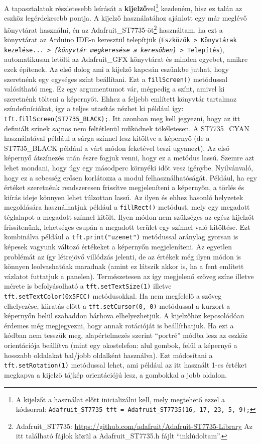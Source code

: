 \documentclass[12pt,a4paper]{article}
\begin{document}
      A tapasztalatok részletesebb leírását a \textbf{kijelző}vel\footnote{A kijelzőt a használat előtt inicializálni kell, mely megtehető ezzel a kódsorral: \texttt{Adafruit\_ST7735 tft = Adafruit\_ST7735(16, 17, 23, 5, 9);}} kezdeném, hisz ez talán az eszköz legérdekesebb pontja.
      A kijelző használatához ajánlott egy már meglévő könyvtárat használni, én az Adafruit\_ST7735-öt\footnote{Adafruit\_ST7735: \url{https://github.com/adafruit/Adafruit-ST7735-Library} Az itt található fájlok közül a Adafruit\_ST7735.h fájlt ``inklúdoltam''.} használtam, ha ezt a könyvtárat az Arduino IDE-n keresztül telepítjük (\texttt{Eszközök > Könyvtárak kezelése... > \textit{\{könyvtár megkeresése a keresőben\}} > Telepítés}), automatikusan letölti az Adafruit\_GFX könyvtárat és minden egyebet, amikre ezek építenek.
      Az első dolog ami a kijelző kapcsán eszünkbe juthat, hogy szeretnénk egy egységes színt beállítani. Ezt a \texttt{fillScreen()} metódussal valósítható meg. Ez egy argumentumot vár, mégpedig a színt, amivel ki szeretnénk tölteni a képernyőt. Ehhez a feljebb említett könyvtár tartalmaz színdefiníciókat, így a teljes utasítás nézhet ki például így: \texttt{tft.fillScreen(ST7735\_BLACK);}. Itt azonban meg kell jegyezni, hogy az itt definiált színek sajnos nem feltétlenül működnek tökéletesen. A ST7735\_CYAN használatával például a sárga színnel lesz kitöltve a képernyő (de a ST7735\_BLACK például a várt módon feketével teszi ugyanezt).
      Az első képernyő átszínezés után észre fogjuk venni, hogy ez a metódus lassú. Szemre azt lehet mondani, hogy úgy egy másodperc környéki időt vesz igénybe. Nyilvánvaló, hogy ez a sebesség erősen korlátozza a modul felhasználhatóságát. Például, ha egy értéket szeretnénk rendszeresen frissítve megjeleníteni a képernyőn, a törlés és kiírás ideje könnyen lehet túlzottan lassú.
      Az ilyen és ehhez hasonló helyzetek megoldására használhatjuk például a \texttt{fillRect()} metódust, mely egy megadott téglalapot a megadott színnel kitölt. Ilyen módon nem szükséges az egész kijelzőt frissítenünk, lehetséges csupán a megadott terület egy színnel való kitöltése. Ezt kombinálva például a \texttt{tft.print("uzenet")} metódussal aránylag gyorsan is képesek vagyunk változó értékeket a képernyőn megjeleníteni. Az egyetlen problémát az így létrejövő villódzás jelenti, de az értékek még ilyen módon is könnyen leolvashatóak maradnak (amint ez látszik akkor is, ha a fent említett vázlatot futtatjuk a panelen). Természetesen az így megjelenő szöveg színe illetve mérete is befolyásolható a \texttt{tft.setTextSize(1)} illetve \texttt{tft.setTextColor(0x5FCC)} metódusokkal. Ha nem megfelelő a szöveg elhelyezése, kiiratás előtt a \texttt{tft.setCursor(0, 0)} metódussal a kurzort a képernyőn belül szabaddon bárhova elhelyezhetjük.
      A kijelzőhöz kepcsolódóan érdemes még megjegyezni, hogy annak rotációját is beállíthatjuk. Ha ezt a kódban nem tesszük meg, alapértelmezés szerint ``portré'' módba lesz az eszköz orientációja beállítva (mint egy okostelefon: alul gombok, felül a képernyő a hosszabb oldalakat bal/jobb oldalként használva). Ezt módosítani a \texttt{tft.setRotation(1)} metódussal lehet, ami például az itt használt 1-es értéket megkapva a kijelző tájkép orientációjú lesz, a gombokkal a jobb oldalon.
\end{document}
